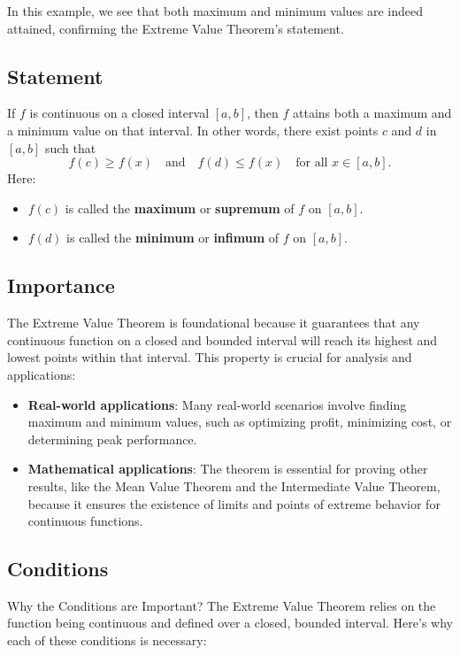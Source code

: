 \documentclass[a4paper,12pt]{book}
\begin{document}
In this example, we see that both maximum and minimum values are indeed attained, confirming the Extreme Value Theorem's statement.

\subsection{Statement}

If \( f \) is continuous on a closed interval \([a, b]\), then \( f \) attains both a maximum and a minimum value on that interval. In other words, there exist points \( c \) and \( d \) in \([a, b]\) such that
\[
f(c) \geqslant f(x) \quad \text{and} \quad f(d) \leqslant f(x) \quad \text{for all } x \in [a, b].
\]
Here:
\begin{itemize}
	\item 
	\( f(c) \) is called the \textbf{maximum} or \textbf{supremum} of \( f \) on \([a, b]\).
	\item 
	\( f(d) \) is called the \textbf{minimum} or \textbf{infimum} of \( f \) on \([a, b]\).
\end{itemize}

\subsection{Importance}

The Extreme Value Theorem is foundational because it guarantees that any continuous function on a closed and bounded interval will reach its highest and lowest points within that interval. This property is crucial for analysis and applications:

\begin{itemize}
	\item 
	\textbf{Real-world applications}: Many real-world scenarios involve finding maximum and minimum values, such as optimizing profit, minimizing cost, or determining peak performance.
	\item 
	\textbf{Mathematical applications}: The theorem is essential for proving other results, like the Mean Value Theorem and the Intermediate Value Theorem, because it ensures the existence of limits and points of extreme behavior for continuous functions.
\end{itemize}	

\subsection{Conditions}

Why the Conditions are Important? The Extreme Value Theorem relies on the function being continuous and defined over a closed, bounded interval. Here’s why each of these conditions is necessary:
\end{document}
